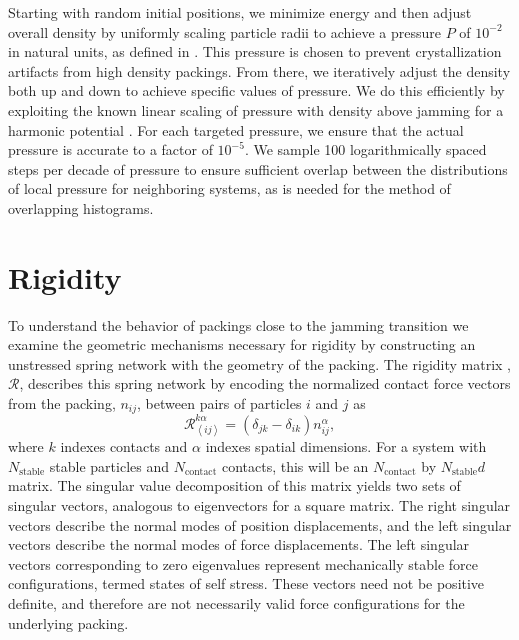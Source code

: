 Starting with random initial positions, we minimize energy and then adjust overall density by uniformly scaling particle radii to achieve a pressure $P$ of $10^{-2}$ in natural units, as defined in \cite{ohern_jamming_2003}. This pressure is chosen to prevent crystallization artifacts from high density packings. From there, we iteratively adjust the density both up and down to achieve specific values of pressure.  We do this efficiently by exploiting the known linear scaling of pressure with density above jamming for a harmonic potential \cite{goodrich_scaling_2016}. For each targeted pressure, we ensure that the actual pressure is accurate to a factor of $10^{-5}$. We sample 100 logarithmically spaced steps per decade of pressure to ensure sufficient overlap between the distributions of local pressure for neighboring systems, as is needed for the method of overlapping histograms.

\section{Rigidity}
To understand the behavior of packings close to the jamming transition we examine the geometric mechanisms necessary for rigidity by constructing an unstressed spring network with the geometry of the packing. The rigidity matrix \cite{charbonneau_jamming_2015, ellenbroek_rigidity_2015, f._hagh_broader_2019}, $\mathcal{R}$, describes this spring network by encoding the normalized contact force vectors from the packing, $n_{i j}$, between pairs of particles $i$ and $j$ as
%
\begin{equation}
    \mathcal{R}^{k \alpha }_{\left<ij\right>}=(\delta_{jk}-\delta_{ik}) n^\alpha_{ij},
\end{equation}
%
 where $k$ indexes contacts and $\alpha$ indexes spatial dimensions. For a system with $N_\textrm{stable}$ stable particles and $N_\textrm{contact}$ contacts, this will be an $N_\textrm{contact}$ by $N_\textrm{stable}d$ matrix.  The singular value decomposition of this matrix yields two sets of singular vectors, analogous to eigenvectors for a square matrix. The right singular vectors describe the normal modes of position displacements, and the left singular vectors describe the normal modes of force displacements. 
The left singular vectors corresponding to zero eigenvalues represent mechanically stable force configurations, termed states of self stress.
These vectors need not be positive definite, and therefore are not necessarily valid force configurations for the underlying packing.
 
